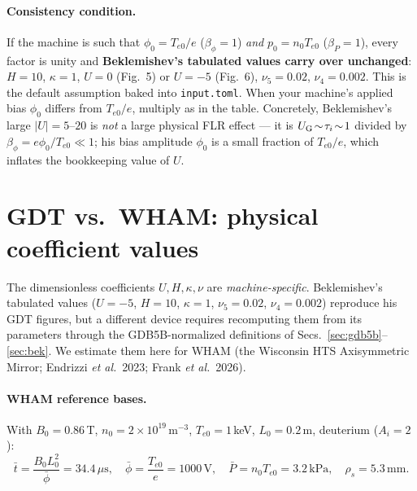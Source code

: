 \documentclass[11pt]{article}
\begin{document}
\paragraph{Consistency condition.} If the machine is such that
$\phi_0=T_{e0}/e$ ($\beta_\phi=1$) \emph{and} $p_0=n_0 T_{e0}$ ($\beta_P=1$),
every factor is unity and \textbf{Beklemishev's tabulated values carry over
unchanged}: $H=10$, $\kappa=1$, $U=0$ (Fig.~5) or $U=-5$ (Fig.~6),
$\nu_5=0.02$, $\nu_4=0.002$. This is the default assumption baked into
\texttt{input.toml}. When your machine's applied bias $\phi_0$ differs from
$T_{e0}/e$, multiply as in the table. Concretely, Beklemishev's large
$|U|=5\text{--}20$ is \emph{not} a large physical FLR effect --- it is
$U_{\rm G}\!\sim\!\tau_i\!\sim\!1$ divided by $\beta_\phi=e\phi_0/T_{e0}\!\ll\!1$;
his bias amplitude $\phi_0$ is a small fraction of $T_{e0}/e$, which inflates the
bookkeeping value of $U$.

\section{GDT vs.\ WHAM: physical coefficient values}
\label{sec:gdtwham}

The dimensionless coefficients $U,H,\kappa,\nu$ are \emph{machine-specific}.
Beklemishev's tabulated values ($U=-5$, $H=10$, $\kappa=1$, $\nu_5=0.02$,
$\nu_4=0.002$) reproduce his GDT figures, but a different device requires
recomputing them from its parameters through the GDB5B-normalized definitions of
Secs.~\ref{sec:gdb5b}--\ref{sec:bek}. We estimate them here for WHAM (the Wisconsin
HTS Axisymmetric Mirror; Endrizzi \emph{et al.}\ 2023; Frank \emph{et al.}\ 2026).

\paragraph{WHAM reference bases.} With $B_0=0.86\,$T, $n_0=2\times10^{19}\,$m$^{-3}$,
$T_{e0}=1\,$keV, $L_0=0.2\,$m, deuterium ($A_i=2$):
\[
  \bar t=\frac{B_0 L_0^2}{\bar\phi}=34.4\,\mu\text{s},\quad
  \bar\phi=\frac{T_{e0}}{e}=1000\,\text{V},\quad
  \bar P=n_0T_{e0}=3.2\,\text{kPa},\quad
  \rho_s=5.3\,\text{mm}.
\]
\end{document}
